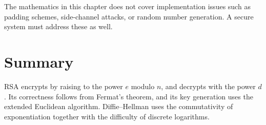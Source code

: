The mathematics in this chapter does not cover implementation issues such as padding schemes, side-channel attacks, or random number generation. A secure system must address these as well.

\section{Summary}

RSA encrypts by raising to the power $e$ modulo $n$, and decrypts with the power $d$. Its correctness follows from Fermat's theorem, and its key generation uses the extended Euclidean algorithm. Diffie--Hellman uses the commutativity of exponentiation together with the difficulty of discrete logarithms.
